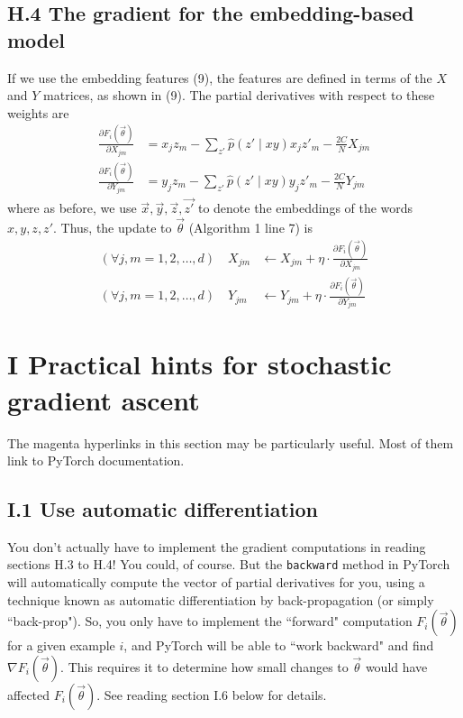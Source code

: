 \documentclass[12pt]{article}
\theoremstyle{plain}
\theoremstyle{definition}
\theoremstyle{remark}
\begin{document}
\subsection*{H.4 The gradient for the embedding-based model}

If we use the embedding features (9), the features are defined in terms of the $X$ and $Y$ matrices, as shown in (9). The partial derivatives with respect to these weights are
\begin{align}
\frac{\partial F_i(\vec{\theta})}{\partial X_{jm}} &= x_j z_m - \sum_{z'} \hat{p}(z' \mid xy)x_j z'_m - \frac{2C}{N}X_{jm} \\
\frac{\partial F_i(\vec{\theta})}{\partial Y_{jm}} &= y_j z_m - \sum_{z'} \hat{p}(z' \mid xy)y_j z'_m - \frac{2C}{N}Y_{jm}
\end{align}
where as before, we use $\vec{x}, \vec{y}, \vec{z}, \vec{z'}$ to denote the embeddings of the words $x, y, z, z'$. Thus, the update to $\vec{\theta}$ (Algorithm 1 line 7) is
\begin{align}
(\forall j,m = 1,2,\ldots,d) \quad X_{jm} &\gets X_{jm} + \eta \cdot \frac{\partial F_i(\vec{\theta})}{\partial X_{jm}} \\
(\forall j,m = 1,2,\ldots,d) \quad Y_{jm} &\gets Y_{jm} + \eta \cdot \frac{\partial F_i(\vec{\theta})}{\partial Y_{jm}}
\end{align}

\section*{ I Practical hints for stochastic gradient ascent}

The magenta hyperlinks in this section may be particularly useful. Most of them link to PyTorch documentation.

\subsection*{I.1 Use automatic differentiation}

You don’t actually have to implement the gradient computations in reading sections H.3 to H.4! You could, of course. But the \texttt{backward} method in PyTorch will automatically compute the vector of partial derivatives for you, using a technique known as automatic differentiation by back-propagation (or simply ``back-prop"). So, you only have to implement the ``forward" computation $F_i(\vec{\theta})$ for a given example $i$, and PyTorch will be able to ``work backward" and find $\nabla F_i(\vec{\theta})$. This requires it to determine how small changes to $\vec{\theta}$ would have affected $F_i(\vec{\theta})$. See reading section I.6 below for details.
\end{document}
